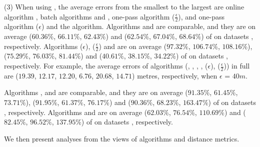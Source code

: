 



\sstab (3) When using \sed, the average errors from the smallest
to the largest are online algorithm \squishe, batch algorithms \tpa and \dpa,
one-pass algorithm \cised($\frac{\epsilon}{2}$), and one-pass algorithm \cised(${\epsilon}$) and the \opt algorithm.
%
Algorithms \tpa and \dpa are comparable, and they are on average
{($60.36\%$, $66.11\%$, $62.43\%$) and ($62.54\%$, $67.04\%$, $68.64\%$)} of \opt on datasets \dSets, respectively.
Algorithms \cised(${\epsilon}$), \cised($\frac{\epsilon}{2}$) and \squishe are on average {($97.32\%$, $106.74\%$, $108.16\%$), ($75.29\%$, $76.03\%$, $81.44\%$) and ($40.61\%$, $38.15\%$, $34.22\%$)} of \opt on datasets \dSets, respectively.
%
For example, the average errors of algorithms
(\opt, \tpa, \dpa, \squishe, \cised(${\epsilon}$), \cised($\frac{\epsilon}{2}$)) in full \mopsi are ($19.39$, $12.17$, $12.20$, $6.76$, $20.68$, $14.71$) metres, respectively, when $\epsilon$ = $40m$.
%


Algorithms \tpa, \opwa and \interval are comparable, and they are on average
{($91.35\%$, $61.45\%$, $73.71\%$), ($91.95\%$, $61.37\%$, $76.17\%$) and ($90.36\%$, $68.23\%$, $163.47\%$)} of \opt on datasets \dSets, respectively.
Algorithms \intersec and \dpa are on average ($62.03\%$, $76.54\%$, $110.69\%$) and ($82.45\%$, $96.52\%$, $137.95\%$) of \opt on datasets \dSets, respectively.




We then present analyses from the views of \lsa algorithms and distance metrics.


